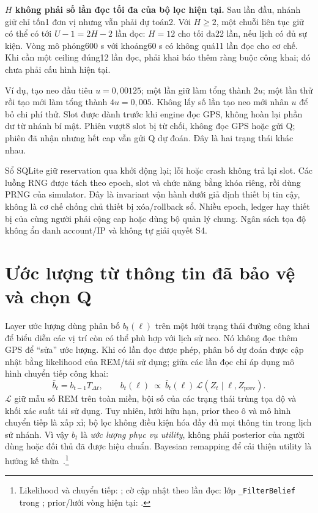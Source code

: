 \textbf{$H$ không phải số lần đọc tối đa của bộ lọc hiện tại.} Sau lần đầu, nhánh giữ chỉ tốn1 đơn vị nhưng vẫn phải dự toán2. Với $H\geq2$, một chuỗi liên tục giữ có thể có tới $U-1=2H-2$ lần đọc: $H=12$ cho tối đa22 lần, nếu lịch có đủ sự kiện. Vòng mô phỏng600 s với khoảng60 s có không quá11 lần đọc cho cơ chế. Khi cần một ceiling đúng12 lần đọc, phải khai báo thêm ràng buộc công khai; đó chưa phải cấu hình hiện tại.

Ví dụ, tạo neo đầu tiêu $u=0{,}00125$; một lần giữ làm tổng thành $2u$; một lần thử rồi tạo mới làm tổng thành $4u=0{,}005$. Không lấy số lần tạo neo mới nhân $u$ để bỏ chi phí thử. Slot được dành trước khi engine đọc GPS, không hoàn lại phần dư từ nhánh bí mật. Phiên vượt8 slot bị từ chối, không đọc GPS hoặc gửi Q; phiên đã nhận nhưng hết cap vẫn gửi Q dự đoán. Đây là hai trạng thái khác nhau.

Sổ SQLite giữ reservation qua khởi động lại; lỗi hoặc crash không trả lại slot. Các luồng RNG được tách theo epoch, slot và chức năng bằng khóa riêng, rồi dùng PRNG của simulator. Đây là invariant vận hành dưới giả định thiết bị tin cậy, không là cơ chế chống chủ thiết bị xóa/rollback sổ. Nhiều epoch, ledger hay thiết bị của cùng người phải cộng cap hoặc dùng bộ quản lý chung. Ngân sách tọa độ không ẩn danh account/IP và không tự giải quyết S4.

\section{Ước lượng từ thông tin đã bảo vệ và chọn Q}
\label{sec:current-belief-planner}

Layer ước lượng dùng phân bố $b_t(\ell)$ trên một lưới trạng thái đường công khai để biểu diễn các vị trí còn có thể phù hợp với lịch sử neo. Nó không đọc thêm GPS để ``sửa'' ước lượng. Khi có lần đọc được phép, phân bố dự đoán được cập nhật bằng likelihood của REM/tái sử dụng; giữa các lần đọc chỉ áp dụng mô hình chuyển tiếp công khai:
\[
 \bar b_t=b_{t-1}T_{\Delta t},\qquad
 b_t(\ell)\ \propto\ \bar b_t(\ell)\,\mathcal L(Z_t\mid \ell,Z_{\mathrm{prev}}).
\]
$\mathcal L$ giữ mẫu số REM trên toàn miền, bội số của các trạng thái trùng tọa độ và khối xác suất tái sử dụng. Tuy nhiên, lưới hữu hạn, prior theo ô và mô hình chuyển tiếp là xấp xỉ; bộ lọc không điều kiện hóa đầy đủ mọi thông tin trong lịch sử nhánh. Vì vậy $b_t$ là \emph{ước lượng phục vụ utility}, không phải posterior của người dùng hoặc đối thủ đã được hiệu chuẩn. Bayesian remapping để cải thiện utility là hướng kế thừa~\cite{chatzikokolakis2017utility}.\footnote{Likelihood và chuyển tiếp: ; cờ cập nhật theo lần đọc: lớp \texttt{\_FilterBelief} trong ; prior/lưới vòng hiện tại: .}

